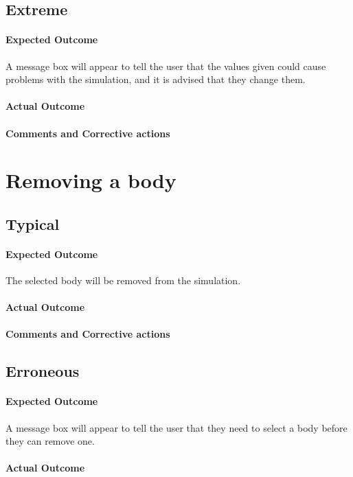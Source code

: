 \subsection{Extreme}
\paragraph{Expected Outcome}
A message box will appear to tell the user that the values given could cause
problems with the simulation, and it is advised that they change them.
\paragraph{Actual Outcome}
\paragraph{Comments and Corrective actions}


\section{Removing a body}
\subsection{Typical}
\paragraph{Expected Outcome}
The selected body will be removed from the simulation.
\paragraph{Actual Outcome}
\paragraph{Comments and Corrective actions}

\subsection{Erroneous}
\paragraph{Expected Outcome}
A message box will appear to tell the user that they need to select a body
before they can remove one.
\paragraph{Actual Outcome}
